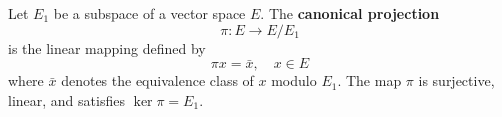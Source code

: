 Let $E_1$ be a subspace of a vector space $E$. The \textbf{canonical projection}
$$\pi: E \to E/E_1$$
is the linear mapping defined by
$$\pi x = \bar{x}, \quad x \in E$$
where $\bar{x}$ denotes the equivalence class of $x$ modulo $E_1$. The map $\pi$ is surjective, linear, and satisfies $\ker \pi = E_1$.
